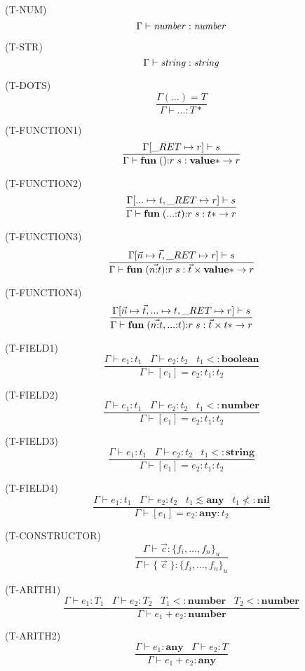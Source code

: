 \documentclass{paper}
\newcommand{\Value}{\mathbf{value}}
\newcommand{\Any}{\mathbf{any}}
\newcommand{\Nil}{\mathbf{nil}}
\newcommand{\Boolean}{\mathbf{boolean}}
\newcommand{\Number}{\mathbf{number}}
\newcommand{\String}{\mathbf{string}}
\newcommand{\mylabel}[1]{\; (\textsc{#1})}
\newcommand{\env}{\Gamma}
\newcommand{\subtype}{<:}
\newcommand{\ret}{\string_RET}
\begin{document}
\mylabel{T-NUM}
\[
\env \vdash {\it number}:{\it number}
\]

\mylabel{T-STR}
\[
\env \vdash {\it string}:{\it string}
\]

\mylabel{T-DOTS}
\[
\dfrac{\env({...}) = T}
      {\env \vdash {...}:T{*}}
\]

\mylabel{T-FUNCTION1}
\[
\dfrac{\env[\ret \mapsto r] \vdash s}
      {\env \vdash \mathbf{fun} \; (){:}r \; s:\Value{*} \rightarrow r}
\]

\mylabel{T-FUNCTION2}
\[
\dfrac{\env[{...} \mapsto t, \ret \mapsto r] \vdash s}
      {\env \vdash \mathbf{fun} \; ({...}{:}t){:}r \; s:t{*} \rightarrow r}
\]

\mylabel{T-FUNCTION3}
\[
\dfrac{\env[\vec{n} \mapsto \vec{t}, \ret \mapsto r] \vdash s}
      {\env \vdash \mathbf{fun} \; (\vec{n{:}t}){:}r \; s:\vec{t} \times \Value{*} \rightarrow r}
\]

\mylabel{T-FUNCTION4}
\[
\dfrac{\env[\vec{n} \mapsto \vec{t}, {...} \mapsto t, \ret \mapsto r] \vdash s}
      {\env \vdash \mathbf{fun} \; (\vec{n{:}t},{...}{:}t){:}r \; s: \vec{t} \times t{*} \rightarrow r}
\]

\mylabel{T-FIELD1}
\[
\dfrac{\env \vdash e_{1}:t_{1} \;\;\;
       \env \vdash e_{2}:t_{2} \;\;\;
       t_{1} \subtype \Boolean}
      {\env \vdash [e_{1}] = e_{2}:t_{1}:t_{2}}
\]

\mylabel{T-FIELD2}
\[
\dfrac{\env \vdash e_{1}:t_{1} \;\;\;
       \env \vdash e_{2}:t_{2} \;\;\;
       t_{1} \subtype \Number}
      {\env \vdash [e_{1}] = e_{2}:t_{1}:t_{2}}
\]

\mylabel{T-FIELD3}
\[
\dfrac{\env \vdash e_{1}:t_{1} \;\;\;
       \env \vdash e_{2}:t_{2} \;\;\;
       t_{1} \subtype \String}
      {\env \vdash [e_{1}] = e_{2}:t_{1}:t_{2}}
\]

\mylabel{T-FIELD4}
\[
\dfrac{\env \vdash e_{1}:t_{1} \;\;\;
       \env \vdash e_{2}:t_{2} \;\;\;
       t_{1} \lesssim \Any \;\;\;
       t_{1} \not\subtype \Nil}
      {\env \vdash [e_{1}] = e_{2}:\Any:t_{2}}
\]

\mylabel{T-CONSTRUCTOR}
\[
\dfrac{\env \vdash \vec{c}:\{ f_{i}, ..., f_{n} \}_{u}}
      {\env \vdash \{ \; \vec{c} \; \}:\{ f_{i}, ..., f_{n} \}_{u}}
\]

\mylabel{T-ARITH1}
\[
\dfrac{\env \vdash e_{1}:T_{1} \;\;\;
       \env \vdash e_{2}:T_{2} \;\;\;
       T_{1} \subtype \Number \;\;\;
       T_{2} \subtype \Number}
      {\env \vdash e_{1} + e_{2}:\Number}
\]

\mylabel{T-ARITH2}
\[
\dfrac{\env \vdash e_{1}:\Any \;\;\;
       \env \vdash e_{2}:T}
      {\env \vdash e_{1} + e_{2}:\Any}
\]
\end{document}
